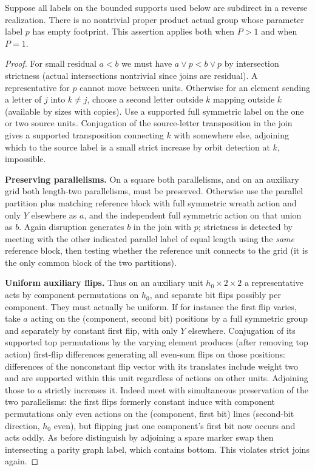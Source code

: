 \begin{lemma}\label{t:weighted-residual-obstruction}
Suppose all labels on the bounded supports used below are subdirect in a
reverse realization.  There is no nontrivial proper product actual group
whose parameter label \(p\) has empty footprint.  This assertion applies
both when \(P>1\) and when \(P=1\).
\end{lemma}
\begin{proof}
For small residual \(a<b\) we must have \(a\vee p<b\vee p\) by intersection strictness (actual
intersections nontrivial since joins are residual). A representative for \(p\) cannot move between
units. Otherwise for an element sending a letter of \(j\) into \(k\ne j\), choose a second letter
outside \(k\) mapping outside \(k\) (available by sizes with copies). Use a supported full
symmetric label on the one or two source units. Conjugation of the source-letter transposition in
the join gives a supported transposition connecting \(k\) with somewhere else, adjoining which to
the source label is a small strict increase by orbit detection at \(k\), impossible.

\noindent\textbf{Preserving parallelisms.} On a square both parallelisms, and on an auxiliary grid both length-two parallelisms, must be preserved. Otherwise use the parallel partition plus matching reference block with full symmetric wreath action and only \(Y\) elsewhere as \(a\), and the independent full symmetric action on that union as \(b\). Again disruption generates \(b\) in the join with \(p\); strictness is detected by meeting with the other indicated parallel label of equal length using the \emph{same} reference block, then testing whether the reference unit connects to the grid (it is the only common block of the two partitions).

\noindent\textbf{Uniform auxiliary flips.} Thus on an auxiliary unit \(h_0\times2\times2\) a representative acts by component permutations on \(h_0\), and separate bit flips possibly per component. They must actually be uniform. If for instance the first flip varies, take \(a\) acting on the (component, second bit) positions by a full symmetric group and separately by constant first flip, with only \(Y\) elsewhere. Conjugation of its supported top permutations by the varying element produces (after removing top action) first-flip differences generating all even-sum flips on those positions: differences of the nonconstant flip vector with its translates include weight two and are supported within this unit regardless of actions on other units. Adjoining those to \(a\) strictly increases it. Indeed meet with simultaneous preservation of the two parallelisms: the first flips formerly constant induce with component permutations only even actions on the (component, first bit) lines (second-bit direction, \(h_0\) even), but flipping just one component's first bit now occurs and acts oddly. As before distinguish by adjoining a spare marker swap then intersecting a parity graph label, which contains bottom. This violates strict joins again.


\end{proof}
